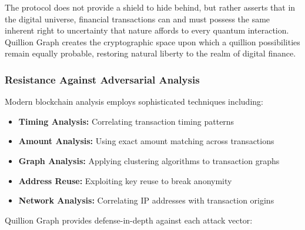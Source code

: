 \documentclass[11pt,a4paper]{article}
\begin{document}
The protocol does not provide a shield to hide behind, but rather asserts that in the digital universe, financial transactions can and must possess the same inherent right to uncertainty that nature affords to every quantum interaction. Quillion Graph creates the cryptographic space upon which a quillion possibilities remain equally probable, restoring natural liberty to the realm of digital finance.

\subsubsection{Resistance Against Adversarial Analysis}

Modern blockchain analysis employs sophisticated techniques including:

\begin{itemize}
    \item \textbf{Timing Analysis:} Correlating transaction timing patterns
    \item \textbf{Amount Analysis:} Using exact amount matching across transactions  
    \item \textbf{Graph Analysis:} Applying clustering algorithms to transaction graphs
    \item \textbf{Address Reuse:} Exploiting key reuse to break anonymity
    \item \textbf{Network Analysis:} Correlating IP addresses with transaction origins
\end{itemize}

Quillion Graph provides defense-in-depth against each attack vector:
\end{document}
